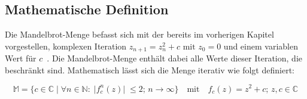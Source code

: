 \subsection{Mathematische Definition}\label{subsec:mathematical-definition}

Die Mandelbrot-Menge befasst sich mit der bereits im vorherigen Kapitel vorgestellen,
komplexen Iteration \(z_{n+1} = z_n^2 + c \text{ mit } z_0 = 0\) und einem variablen
Wert für \(c\)~\cite*[S.25]{schuh_fraktale_2017}.
Die Mandelbrot-Menge enthält dabei alle Werte dieser Iteration, die beschränkt sind.
Mathematisch lässt sich die Menge iterativ wie folgt definiert:

\[
  \mathbb{M} = \{c \in \mathbb{C} \; |\;  \forall n \in \mathbb{N}:\; |f_c^n(z)|\; \leqslant 2;\, n \to \infty\}
  \quad
  \text{mit}
  \quad
  f_c(z) = z^2 + c;\, z,c \in \mathbb{C}
\]


